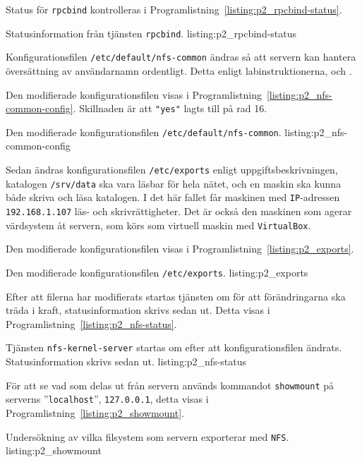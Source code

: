 Status för \texttt{rpcbind} kontrolleras i
Programlistning~\ref{listing:p2_rpcbind-status}.

            {Statusinformation från tjänsten \texttt{rpcbind}.}
            {listing:p2_rpcbind-status}


Konfigurationsfilen \texttt{/etc/default/nfs-common} ändras så att servern kan
hantera översättning av användarnamn ordentligt.
Detta enligt labinstruktionerna\cite{dvg001:instruktionerLab5},
\cite{ubuntu:NFSv4howto} och \cite{ubuntu:settingupNFShowto}.

Den modifierade konfigurationsfilen visas i
Programlistning~\ref{listing:p2_nfs-common-config}.
Skillnaden är att \texttt{"yes"} lagts till på rad 16.

            {Den modifierade konfigurationsfilen \texttt{/etc/default/nfs-common}.}
            {listing:p2_nfs-common-config}

Sedan ändras konfigurationsfilen \texttt{/etc/exports} enligt
uppgiftsbeskrivningen, katalogen \texttt{/srv/data} ska vara läsbar för hela
nätet, och en maskin ska kunna både skriva och läsa katalogen. 
I det här fallet får maskinen med \texttt{IP}-adressen \texttt{192.168.1.107}
läs- och skrivrättigheter. Det är också den maskinen som agerar värdsystem åt
servern, som körs som virtuell maskin med \texttt{VirtualBox}.

Den modifierade konfigurationsfilen visas i
Programlistning~\ref{listing:p2_exports}.

            {Den modifierade konfigurationsfilen \texttt{/etc/exports}.}
            {listing:p2_exports}


Efter att filerna har modifierats startas tjänsten om för att förändringarna
ska träda i kraft, statusinformation skrivs sedan ut. Detta visas i
Programlistning~\ref{listing:p2_nfs-status}.

            {Tjänsten \texttt{nfs-kernel-server} startas om efter att
             konfigurationsfilen ändrats. Statusinformation skrivs sedan ut.}
            {listing:p2_nfs-status}


För att se vad som delas ut från servern används kommandot \texttt{showmount}
på serverns ''\texttt{localhost}'', \texttt{127.0.0.1}, detta visas i 
Programlistning~\ref{listing:p2_showmount}.

            {Undersökning av vilka filsystem som servern exporterar med 
             \texttt{NFS}.}
            {listing:p2_showmount}


